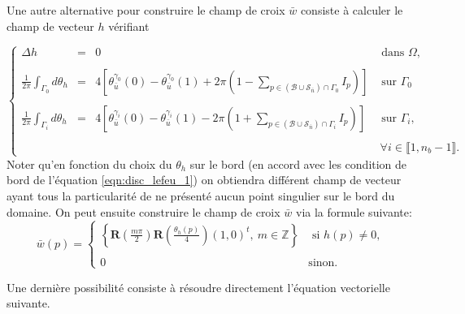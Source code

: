 Une autre alternative pour construire le champ de croix $\bar{w}$ consiste à calculer le champ de vecteur $h$ vérifiant

\begin{equation}
\left\{
\begin{array}{lcll}
    \Delta h &=& 0 & \mbox{ dans }\Omega,\\\\
    \displaystyle\frac{1}{2\pi}\displaystyle\int_{\Gamma_0}d\theta_{h} &=&4\left[\theta_{\bar{u}}^{\gamma_0}(0)-\theta_{\bar{u}}^{\gamma_0}(1)+2\pi\left(1-\displaystyle\sum_{p\in(\mathcal{B}\cup\mathcal{S}_{\bar{n}})\cap\Gamma_0}I_p\right)\right]&\mbox{ sur }\Gamma_0\\\\
    \displaystyle\frac{1}{2\pi}\displaystyle\int_{\Gamma_i}d\theta_{h} &=& 4\left[\theta_{\bar{u}}^{\gamma_i}(0)-\theta_{\bar{u}}^{\gamma_i}(1)-2\pi\left(1+\displaystyle\sum_{p\in(\mathcal{B}\cup\mathcal{S}_{\bar{n}})\cap\Gamma_i}I_p\right)\right]&\mbox{ sur }\Gamma_i,\\\\
    &&&~\forall i\in\llbracket 1, n_b-1\rrbracket.
\end{array}
\right.
\label{eqn:disc_lefeu_1}
\end{equation}
Noter qu'en fonction du choix du $\theta_h$ sur le bord (en accord avec les condition de bord de l'équation \ref{eqn:disc_lefeu_1}) on obtiendra différent champ de vecteur ayant tous la particularité de ne présenté aucun point singulier sur le bord du domaine. On peut ensuite construire le champ de croix $\bar{w}$ via la formule suivante:
\begin{equation}
    \bar{w}(p) =
\left\{
    \begin{array}{ll}
        \displaystyle\left\{\mathbf{R}\left(\frac{m\pi}{2}\right)\mathbf{R}\left(\frac{\theta_h(p)}{4}\right)(1, 0)^t,~ m\in \mathbb{Z}\right\} &\text{ si }h(p)\neq 0,\\\\
        0& \text{sinon}.
    \end{array}
\right.
\label{eqn:disc_repr_to_cross}
\end{equation}

Une dernière possibilité consiste à résoudre directement l'équation vectorielle suivante.

